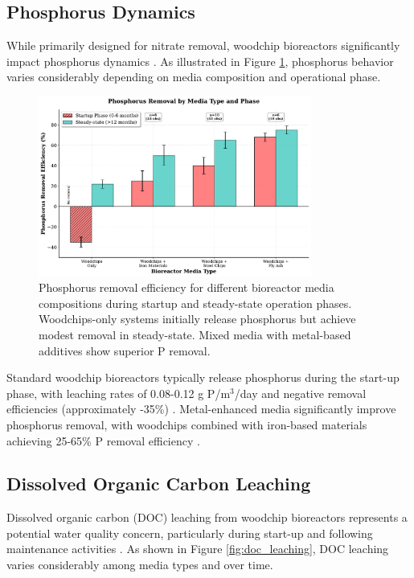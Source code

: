 \documentclass[12pt,a4paper]{article}
\begin{document}
\subsection{Phosphorus Dynamics}

While primarily designed for nitrate removal, woodchip bioreactors significantly impact phosphorus dynamics \citep{RN625, RN625}. As illustrated in Figure \ref{fig:phosphorus_removal}, phosphorus behavior varies considerably depending on media composition and operational phase.

\begin{figure}[ht]
\centering
\includegraphics[width=0.8\textwidth]{fig7_phosphorus_scientific}
\caption{Phosphorus removal efficiency for different bioreactor media compositions during startup and steady-state operation phases. Woodchips-only systems initially release phosphorus but achieve modest removal in steady-state. Mixed media with metal-based additives show superior P removal.}
\label{fig:phosphorus_removal}
\end{figure}

Standard woodchip bioreactors typically release phosphorus during the start-up phase, with leaching rates of 0.08-0.12 g P/m$^3$/day and negative removal efficiencies (approximately -35\%) \citep{RN625}. Metal-enhanced media significantly improve phosphorus removal, with woodchips combined with iron-based materials achieving 25-65\% P removal efficiency \citep{RN625}.

\subsection{Dissolved Organic Carbon Leaching}

Dissolved organic carbon (DOC) leaching from woodchip bioreactors represents a potential water quality concern, particularly during start-up and following maintenance activities \citep{RN625, RN242}. As shown in Figure \ref{fig:doc_leaching}, DOC leaching varies considerably among media types and over time.
\end{document}
